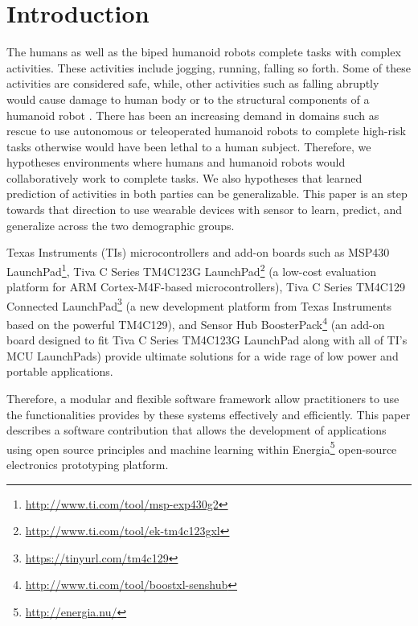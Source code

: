 \documentclass[letterpaper]{article}
\begin{document}
\section{Introduction}

The humans as well as the biped humanoid robots complete tasks with complex activities. These 
activities include jogging, running, falling so forth. Some of these activities are 
considered safe, while, other activities such as falling abruptly would cause damage to human body 
or to the structural components of a humanoid robot \cite{li2009accurate}. There has been an 
increasing demand in domains such as rescue to use autonomous or teleoperated humanoid robots to 
complete high-risk tasks otherwise would have been lethal to a human subject. Therefore, we 
hypotheses environments where humans and humanoid robots would collaboratively work to complete 
tasks. We also hypotheses that learned prediction of activities in both parties can be 
generalizable. This paper is an step towards that direction to use wearable devices with sensor to 
learn, predict, and generalize across the two demographic groups.

Texas Instruments (TIs) microcontrollers and add-on boards such as MSP430{\texttrademark}
LaunchPad\footnote{\url{http://www.ti.com/tool/msp-exp430g2}},
Tiva{\texttrademark} C Series TM4C123G
LaunchPad\footnote{\url{http://www.ti.com/tool/ek-tm4c123gxl}} (a low-cost evaluation platform for
ARM
Cortex-M4F-based microcontrollers), Tiva C Series TM4C129 Connected
LaunchPad\footnote{\url{https://tinyurl.com/tm4c129}} (a new
development platform from Texas Instruments
based on the powerful TM4C129), and Sensor
Hub BoosterPack\footnote{\url{http://www.ti.com/tool/boostxl-senshub}} (an add-on board designed to
fit Tiva C Series TM4C123G LaunchPad
along with all of TI’s MCU LaunchPads) provide ultimate solutions
for a wide rage of low power and portable applications.

Therefore, a modular and flexible software
framework allow practitioners to use the functionalities provides by these systems effectively
and efficiently. This paper describes a software contribution that allows the development of
applications using open source principles and machine learning within
Energia\footnote{\url{http://energia.nu/}} open-source electronics prototyping platform.
\end{document}
